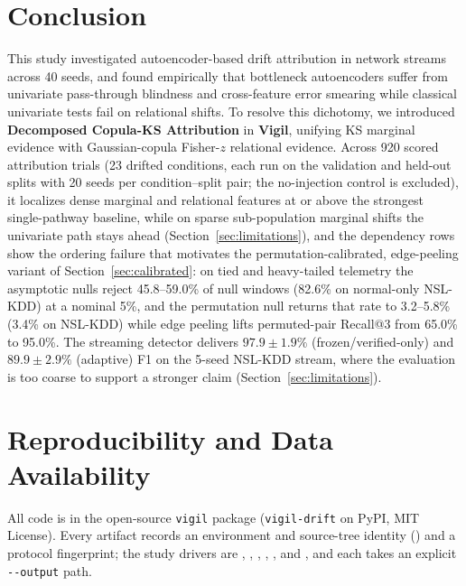 \documentclass[10pt,conference]{IEEEtran}
\begin{document}
\section{Conclusion}

This study investigated autoencoder-based drift attribution in network streams
across 40 seeds, and found empirically that bottleneck autoencoders suffer from
univariate pass-through blindness and cross-feature error smearing while
classical univariate tests fail on relational shifts. To resolve this dichotomy,
we introduced \textbf{Decomposed Copula-KS Attribution} in \textbf{Vigil},
unifying KS marginal evidence with Gaussian-copula Fisher-$z$ relational
evidence. Across 920 scored attribution trials (23 drifted conditions, each run on
the validation and held-out splits with 20 seeds per condition--split pair; the
no-injection control is excluded), it localizes dense marginal and
relational features at or above the
strongest single-pathway baseline, while on sparse sub-population marginal
shifts the univariate path stays ahead (Section~\ref{sec:limitations}), and the
dependency rows show the ordering failure that
motivates the permutation-calibrated, edge-peeling variant of
Section~\ref{sec:calibrated}: on tied and heavy-tailed telemetry the asymptotic
nulls reject 45.8--59.0\% of null windows (82.6\% on normal-only NSL-KDD) at a
nominal 5\%, and the permutation null returns that rate to 3.2--5.8\% (3.4\% on
NSL-KDD) while edge peeling lifts permuted-pair Recall@3 from 65.0\% to 95.0\%.
The streaming detector delivers
$97.9 \pm 1.9\%$ (frozen/verified-only) and $89.9 \pm 2.9\%$ (adaptive) F1 on the
5-seed NSL-KDD stream, where the evaluation is too coarse to support a
stronger claim (Section~\ref{sec:limitations}).

\section*{Reproducibility and Data Availability}

All code is in the open-source \texttt{vigil} package (\texttt{vigil-drift} on
PyPI, MIT License). Every artifact records an environment and source-tree identity
() and a protocol fingerprint; the
study drivers are ,
, ,
,
, and ,
and each takes an explicit \texttt{-{}-output} path.
\end{document}
